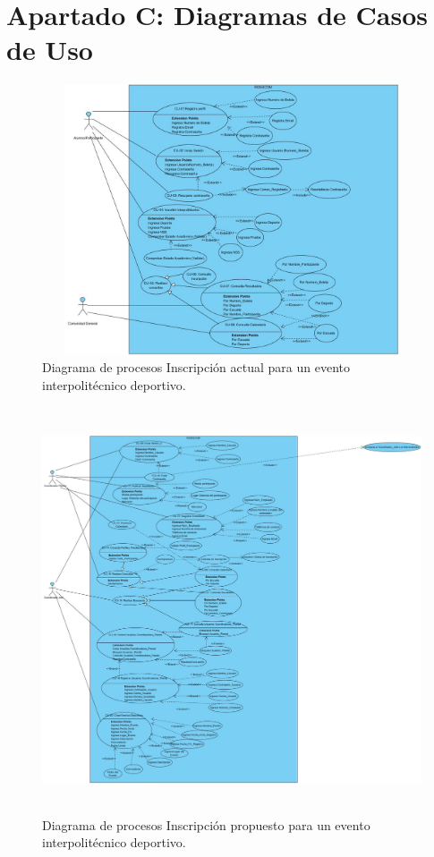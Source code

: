 	\section{Apartado C: Diagramas de Casos de Uso}
		\begin{figure}[hbt!]
			\centering
			\includegraphics[width=16cm, height=8cm]{Imagenes/Disenos/DiagramasCU/Alumno.jpg}
			\caption{Diagrama de procesos Inscripción actual para un evento interpolitécnico deportivo.}
			\label{Inscripcion}
		\end{figure}
		\begin{figure}[hbt!]
			\centering
			\includegraphics[width=16cm, height=12cm]{Imagenes/Disenos/DiagramasCU/CoordinadorJefe.jpg}
			\caption{Diagrama de procesos Inscripción propuesto para un evento interpolitécnico deportivo.}
			\label{Inscripcion}
		\end{figure}
	\pagebreak

